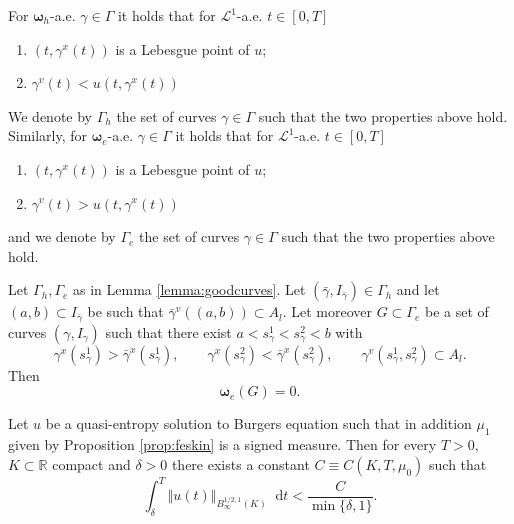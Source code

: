 \documentclass[10pt,a4paper]{amsart}
\newcommand*\dif{\mathop{}\!\mathrm{d}}
\newcommand{\bs}[1]{\boldsymbol{#1}}
\newcommand{\msc}[1]{\mathscr{#1}}
\begin{document}
   \begin{lemma}\label{lemma:goodcurves}
       For $\bs \omega_h$-a.e. $\gamma \in \Gamma$ it holds that for $\msc L^1$-a.e. $t \in [0,T]$
       \begin{enumerate}
           \item $(t, \gamma^x(t))$ is a Lebesgue point of $u$;
           \item $\gamma^v(t) < u(t, \gamma^x(t))$
       \end{enumerate}
       We denote by $\Gamma_h$ the set of curves $\gamma \in \Gamma$ such that the two properties above hold. Similarly, for $\bs \omega_e$-a.e. $\gamma \in \Gamma$ it holds that for $\msc L^1$-a.e. $t \in [0,T]$
       \begin{enumerate}
           \item $(t, \gamma^x(t))$ is a Lebesgue point of $u$;
           \item $\gamma^v(t) > u(t, \gamma^x(t))$
       \end{enumerate}
       and we denote by $\Gamma_e$ the set of curves $\gamma \in \Gamma$ such that the two properties above hold. 
\end{lemma}

\begin{lemma}\label{lemma:nocrossing}
    Let $\Gamma_h, \Gamma_e$ as in Lemma \ref{lemma:goodcurves}. Let $(\bar \gamma, I_{\bar \gamma}) \in \Gamma_h$ and let $(a, b) \subset I_{\bar \gamma}$ 
 be such that $\bar \gamma^v((a, b) )\subset A_l$. Let moreover $G \subset \Gamma_e$ be a set of curves $(\gamma, I_{\gamma})$ such that there exist $a < s^1_{\gamma} < s^2_{\gamma}< b$ with
\begin{equation}\label{eq:crossingcond}
    \gamma^x(s^1_{\gamma}) > \bar \gamma^x (s^1_{\gamma}), \qquad \gamma^x(s^2_{\gamma}) <  \bar \gamma^x (s^2_{\gamma}), \qquad \gamma^v(s^1_{\gamma}, s^2_{\gamma}) \subset A_l.
\end{equation}
Then 
\begin{equation}
    \bs \omega_e(G) = 0.
\end{equation}
\end{lemma}

\begin{thm}\label{thm:besov}
     Let $u$ be a quasi-entropy solution to Burgers equation such that in addition $\mu_1$ given by Proposition \ref{prop:feskin} is a signed measure.
Then for every $T> 0$, $K \subset \mathbb R$ compact and $\delta > 0$ there exists a constant $C \equiv C(K, T, \mu_0)$ such that 
\begin{equation}
\int_{\delta}^T \Vert u(t)\Vert_{B^{1/2, 1}_{\infty}(K)} \dif t < \frac{C}{\min\{\delta,1\}}.
\end{equation}
 \end{thm}
\end{document}
